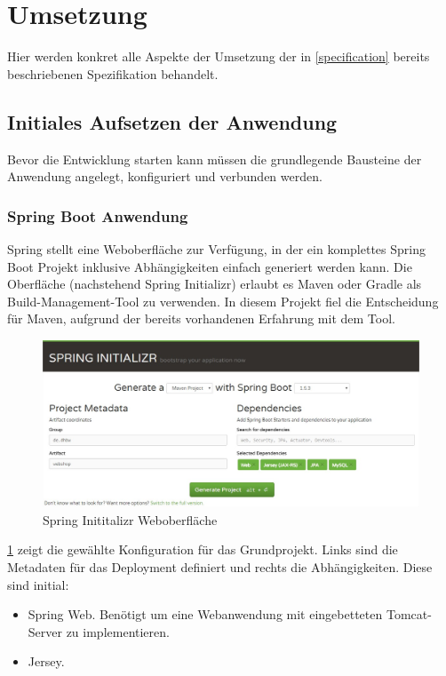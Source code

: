 \section{Umsetzung}
Hier werden konkret alle Aspekte der Umsetzung der in \cref{specification} bereits beschriebenen Spezifikation behandelt. %
 
\subsection{Initiales Aufsetzen der Anwendung}
Bevor die Entwicklung starten kann müssen die grundlegende Bausteine der Anwendung angelegt, konfiguriert und verbunden werden. 

\subsubsection{Spring Boot Anwendung}
Spring stellt eine Weboberfläche zur Verfügung, in der ein komplettes Spring Boot Projekt inklusive Abhängigkeiten einfach generiert werden kann. Die Oberfläche (nachstehend Spring Initializr) erlaubt es Maven oder Gradle als Build-Management-Tool zu verwenden. In diesem Projekt fiel die Entscheidung für Maven, aufgrund der bereits vorhandenen Erfahrung mit dem Tool. 

\begin{figure}[th!]
	\centering
	\includegraphics[width=\linewidth]{bilder/kap7/Spring-Initializr}
	\caption{Spring Inititalizr Weboberfläche\cite{}}
	\label{fig:spring-initializr}
\end{figure}

\cref{fig:spring-initializr} zeigt die gewählte Konfiguration für das Grundprojekt. Links sind die Metadaten für das Deployment definiert und rechts die Abhängigkeiten. Diese sind initial:
\begin{itemize}
	\item Spring Web. Benötigt um eine Webanwendung mit eingebetteten Tomcat-Server zu implementieren.
	\item Jersey. 
\end{itemize}


